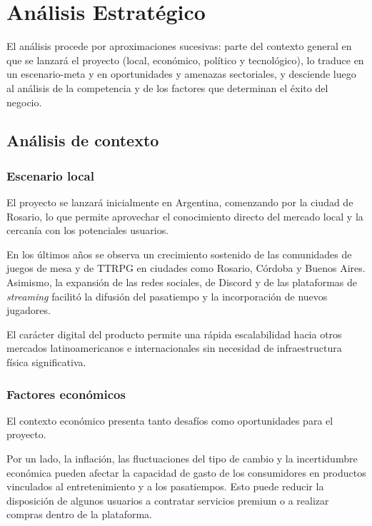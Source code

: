 \capredactadotrue
\section{Análisis Estratégico}\label{sec:analisis-estrategico}

El análisis procede por aproximaciones sucesivas: parte del contexto general en que se lanzará el proyecto (local, económico, político y tecnológico), lo traduce en un escenario-meta y en oportunidades y amenazas sectoriales, y desciende luego al análisis de la competencia y de los factores que determinan el éxito del negocio.

\subsection{Análisis de contexto}

\subsubsection{Escenario local}\label{sec:escenario-local}
El proyecto se lanzará inicialmente en Argentina, comenzando por la ciudad de Rosario, lo que permite aprovechar el conocimiento directo del mercado local y la cercanía con los potenciales usuarios.

En los últimos años se observa un crecimiento sostenido de las comunidades de juegos de mesa y de TTRPG en ciudades como Rosario, Córdoba y Buenos Aires. Asimismo, la expansión de las redes sociales, de Discord y de las plataformas de \textit{streaming} facilitó la difusión del pasatiempo y la incorporación de nuevos jugadores.

El carácter digital del producto permite una rápida escalabilidad hacia otros mercados latinoamericanos e internacionales sin necesidad de infraestructura física significativa.

\subsubsection{Factores económicos}\label{sec:economicos}
El contexto económico presenta tanto desafíos como oportunidades para el proyecto.

Por un lado, la inflación, las fluctuaciones del tipo de cambio y la incertidumbre económica pueden afectar la capacidad de gasto de los consumidores en productos vinculados al entretenimiento y a los pasatiempos. Esto puede reducir la disposición de algunos usuarios a contratar servicios premium o a realizar compras dentro de la plataforma.

